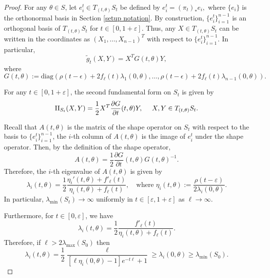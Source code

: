 \documentclass[JEP,XML,SOM,Unicode,NoFloatCountersInSection]{cedram}
\theoremstyle{definition}
\let\eps\varepsilon
\newcommand{\RomanNumeralCaps}[1]
{\MakeUppercase{\romannumeral #1}}
\newcommand{\II}{\textup{\RomanNumeralCaps{2}}}
\renewcommand{\>}{{\rangle}}
\newcommand{\<}{{\langle}}
\begin{document}
\begin{proof}
For any $\theta\in S$, let $e_i^t\in T_{(t,\theta)}S_t$ be defined by $e_i^t = (\pi_t)_{*}e_i,$ where $\{e_i\}$ is the orthonormal basis in Section \ref{setup notation}.
By construction, $\{e_i^t\}_{i=1}^{n-1}$ is an orthogonal basis of $T_{(t,\theta)}S_t$ for $t\in[0,1+\eps]$. Thus, any $X\in T_{(t,\theta)}S_t$ can be written in the coordinates as $(X_1,\ldots,X_{n-1})^T$ with respect to $\{e_i^t\}_{i=1}^{n-1}$. In particular,
\begin{equation*}
\tilde g_t(X,Y) = X^TG(t,\theta)Y,
\end{equation*}
where
\begin{equation*}
G(t,\theta):=\text{diag}(\rho(t-\epsilon)+2f_{\ell}(t)\lambda_1(0,\theta),\dots, \rho(t-\epsilon)+2f_{\ell}(t)\lambda_{n-1}(0,\theta)).
\end{equation*}

For any $t\in[0,1+\eps]$, the second fundamental form on $S_t$ is given by
\begin{equation*}
\II_{S_t}(X,Y)=\frac{1}{2}X^T\frac{\partial G}{\partial t} (t,\theta)Y,\quad \text{ } X,Y\in T_{(t,\theta)}S_t.
\end{equation*}

Recall that $A(t,\theta)$ is the matrix of the shape operator on $S_t$ with respect to the basis to $\{e_i^t\}_{i=1}^{n-1}$, \ie the $i$-th column of $A(t,\theta)$ is the image of $e_i^t$ under the shape operator. Then, by the definition of the shape operator,
\begin{equation*}
A(t,\theta) = \frac{1}{2}\frac{\partial G}{\partial t}(t,\theta)G(t,\theta)^{-1}.
\end{equation*}
Therefore, the $i$-th eigenvalue of $A(t,\theta)$ is given by
\begin{equation*}
\lambda_i(t,\theta) = \frac{1}{2}\frac{\eta_i'(t,\theta)+f'_{\ell}(t)}{\eta_i(t,\theta)+f_{\ell}(t)}, \quad \text{where } \eta_i(t,\theta):=\frac{\rho(t-\eps)}{2\lambda_i(0,\theta)}.
\end{equation*}
In particular, $\lambda_{\min}(S_t)\to\infty$ uniformly in $t\in[\eps,1+\eps]$ as $\ell\to\infty$.

Furthermore, for $t\in[0,\eps]$, we have
\begin{equation}\label{eqn: lambdai_t_0_ep}
\lambda_i(t,\theta) = \frac{1}{2} \frac{f'_{\ell}(t)}{\eta_i(t,\theta)+f_\ell(t)}.
\end{equation}
Therefore, if $\ell>2\lambda_{\max}(S_0)$ then
\[
\lambda_i(t,\theta)= \frac{1}{2}\frac{\ell}{[\ell\eta_i(0,\theta)-1]e^{-t\ell}+1}\geq \lambda_i(0,\theta)\geq\lambda_{\min}(S_0).
\]


\end{proof}
\end{document}
